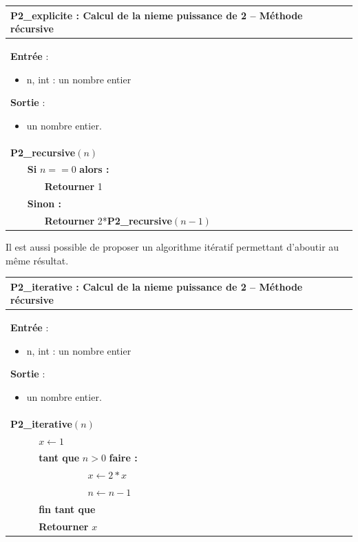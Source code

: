\documentclass[10pt,fleqn]{article} %
\newcommand{\bfsf}[1]{\textbf{{#1}}}%
\begin{document}
\begin{pseudo}
\begin{tabular}{p{.5cm}p{.5cm}p{10cm}}
\hline
\multicolumn{3}{l}{ \textbf{P2\_explicite} : Calcul de la nieme puissance de 2 -- Méthode récursive} \\
\hline
\multicolumn{3}{p{11cm}}{
\textbf{Entrée} : 
\begin{itemize}
\item n, int  : un nombre entier
\end{itemize}
\textbf{Sortie} : 
\begin{itemize}
\item un nombre entier.
\end{itemize}}\\
\multicolumn{3}{l}{\bfsf{P2\_recursive}$(n)$} : \\
& \multicolumn{2}{l}{\bfsf{Si} $n==0$  \bfsf{alors :}}\\
& & \bfsf{Retourner} 1\\
& \multicolumn{2}{l}{\bfsf{Sinon :}}\\
& & \bfsf{Retourner} 2*\bfsf{P2\_recursive}$(n-1)$ \\
\hline
\end{tabular}
\end{pseudo}

Il est aussi possible de proposer un algorithme itératif permettant d’aboutir au même résultat.

\begin{pseudo}
\begin{tabular}{p{.5cm}p{.5cm}p{10cm}}
\hline
\multicolumn{3}{l}{ \textbf{P2\_iterative} : Calcul de la nieme puissance de 2 -- Méthode récursive} \\
\hline
\multicolumn{3}{p{11cm}}{
\textbf{Entrée} : 
\begin{itemize}
\item n, int  : un nombre entier
\end{itemize}
\textbf{Sortie} : 
\begin{itemize}
\item un nombre entier.
\end{itemize}}\\
\multicolumn{3}{l}{\bfsf{P2\_iterative}$(n)$} : \\
& \multicolumn{2}{l}{$x \leftarrow 1$}\\
& \multicolumn{2}{l}{\bfsf{tant que} $n>0$ \bfsf{faire :}}\\
& & $x \leftarrow 2 * x$ \\
& & $n \leftarrow n-1$ \\
& \multicolumn{2}{l}{\bfsf{fin tant que}}\\
& \multicolumn{2}{l}{\bfsf{Retourner} $x$}\\
\hline
\end{tabular}
\end{pseudo}
\end{document}
